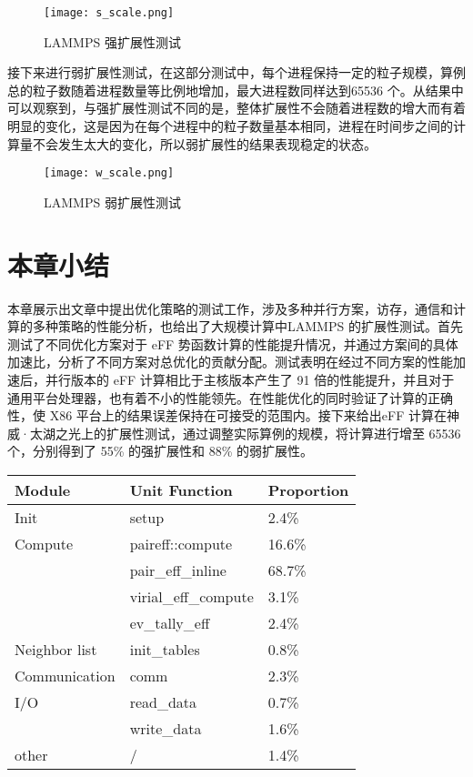  \begin{figure}[h]
  \centering
  \texttt{[image: s\_scale.png]}
  \caption{LAMMPS 强扩展性测试}
\end{figure}

 接下来进行弱扩展性测试，在这部分测试中，每个进程保持一定的粒子规模，算例总的粒子数随着进程数量等比例地增加，最大进程数同样达到65536 个。从结果中可以观察到，与强扩展性测试不同的是，整体扩展性不会随着进程数的增大而有着明显的变化，这是因为在每个进程中的粒子数量基本相同，进程在时间步之间的计算量不会发生太大的变化，所以弱扩展性的结果表现稳定的状态。

  \begin{figure}[h]
  \centering
  \texttt{[image: w\_scale.png]}
  \caption{LAMMPS 弱扩展性测试}
\end{figure}

\section{本章小结}
本章展示出文章中提出优化策略的测试工作，涉及多种并行方案，访存，通信和计算的多种策略的性能分析，也给出了大规模计算中LAMMPS 的扩展性测试。首先测试了不同优化方案对于 eFF 势函数计算的性能提升情况，并通过方案间的具体加速比，分析了不同方案对总优化的贡献分配。测试表明在经过不同方案的性能加速后，并行版本的 eFF 计算相比于主核版本产生了 91 倍的性能提升，并且对于通用平台处理器，也有着不小的性能领先。在性能优化的同时验证了计算的正确性，使 X86 平台上的结果误差保持在可接受的范围内。接下来给出eFF 计算在神威·太湖之光上的扩展性测试，通过调整实际算例的规模，将计算进行增至 65536 个，分别得到了 55\% 的强扩展性和 88\% 的弱扩展性。


\begin{table}[]
  \centering
  \renewcommand{\arraystretch}{1.5}
\begin{tabular}{lll}
\hline
Module        & Unit Function        & Proportion \\ \hline
Init          & setup                & 2.4\%      \\ \hline
Compute       & paireff::compute     & 16.6\%     \\ \cline{2-3} 
              & pair\_eff\_inline    & 68.7\%     \\ \cline{2-3} 
              & virial\_eff\_compute & 3.1\%      \\ \cline{2-3} 
              & ev\_tally\_eff       & 2.4\%      \\ \hline
Neighbor list & init\_tables         & 0.8\%      \\ \hline
Communication & comm                 & 2.3\%      \\ \hline
I/O           & read\_data           & 0.7\%      \\ \cline{2-3} 
              & write\_data          & 1.6\%      \\ \hline
other         & /                    & 1.4\%      \\ \hline
\end{tabular}
\end{table}
